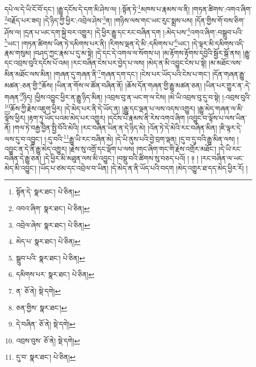 དཔེ་ལ་དེ་ཡི་ངོ་བོ་དང་། །རྒྱུ་དངོས་དེ་དག་མི་ཤེས་ལ། །:སྟོན་ཏེ་\footnote{སྟོན་དེ་  སྣར་ཐང་།  པེ་ཅིན། }མཁས་པ་རྣམས་ལ་ནི། །གཏན་ཚིགས་:འགའ་ཞིག་\footnote{འབའ་ཞིག་  སྣར་ཐང་།  པེ་ཅིན། }བརྗོད་པར་ཟད། །དེ་ཉིད་ཀྱི་ཕྱིར་:འབྲེལ་ཤེས་\footnote{འབྲེལ་ཞེས་  སྣར་ཐང་།  པེ་ཅིན། }ན། །གཉིས་ལས་གང་ཡང་རུང་སྨྲས་པས། །དོན་གྱིས་གོ་བས་ཅིག་ཤོས་ལ། །དྲན་པ་ཡང་དག་སྐྱེ་བར་འགྱུར། །དེ་ཕྱིར་རྒྱུ་དང་རང་བཞིན་དག །:མེད་པས་\footnote{མེད་པ་  སྣར་ཐང་།  པེ་ཅིན། }འགའ་ཞིག་:བསྒྲུབ་པའི་\footnote{སྒྲུབ་པའི་  སྣར་ཐང་།  པེ་ཅིན། }ཡང་། །གཏན་ཚིགས་ཡིན་ཏེ་དམིགས་པར་ནི། །རིགས་ལྡན་དེ་མི་:དམིགས་པ་\footnote{དམིགས་པར་  སྣར་ཐང་།  པེ་ཅིན། }ཡང་། །དེ་ལྟར་མི་དམིགས་འདི་རྣམ་གསུམ། །བཤད་ཀྱང་རྣམ་པ་དུ་མ་སྟེ། །དེ་དང་དེ་འགལ་ལ་སོགས་པ། །མ་རྟོགས་རྟོགས་དབྱེའི་སྦྱོར་སྒོ་ནས། །རྒྱུ་དང་འབྲས་བུའི་དངོས་པོ་འམ། །རང་བཞིན་ངེས་པར་བྱེད་པ་ལས། །མེད་ན་མི་འབྱུང་ངེས་པ་སྟེ། །མ་མཐོང་ལས་མིན་མཐོང་ལས་མིན། །གཞན་དུ་གཞན་ནི་\footnote{ན་  ཅོ་ནེ།  སྡེ་དགེ། }གཞན་དག་དང་། །ངེས་པར་ཡོད་པའི་ངེས་པ་གང་། །དོན་གཞན་རྒྱུ་མཚན་:ཅན་གྱི་\footnote{ཅན་གྱིས་  སྣར་ཐང་། }ཆོས། །ཡིན་ན་གོས་ལ་ཚོན་བཞིན་ནོ། །ཆོས་དོན་གཞན་གྱི་རྒྱུ་མཚན་ཅན། །ཡིན་པར་གྱུར་ན་:དེ་གཞན་\footnote{དེ་བཞིན་  ཅོ་ནེ།  སྡེ་དགེ། }ཉིད། །ཕྱིས་འབྱུང་ཕྱིར་ན་རྒྱུ་ཉིད་མིན། །འབྲས་བུ་ན་ཡང་ག་ལ་ངེས། །མེ་ཡི་འབྲས་བུ་དུ་བ་སྟེ། །:འབྲས་བུའི་\footnote{འབྲས་བུས་  ཅོ་ནེ།  སྡེ་དགེ། }ཆོས་ཀྱི་རྗེས་འཇུག་ཕྱིར། །དེ་མེད་པར་ནི་དེ་ཡོད་ན། །རྒྱུ་དང་ལྡན་པ་ལས་འདས་འགྱུར། །རྒྱུ་མེད་གཞན་ལ་མི་ལྟོས་ཕྱིར། །རྟག་ཏུ་ཡོད་པའམ་མེད་པར་འགྱུར། །དངོས་པོ་རྣམས་ནི་རེས་འགའ་ཞིག །འབྱུང་བ་ལྟོས་པ་ལས་ཡིན་ནོ། །གལ་ཏེ་བརྒྱ་བྱིན་སྤྱི་བོའི་མེའི། །རང་བཞིན་ཡིན་ན་དེ་ཉིད་མེ། །འོན་ཏེ་དེ་མེའི་རང་བཞིན་མིན། །ཇི་ལྟར་དེ་ལས་དུ་བ་འབྱུང་། །:དུ་བའི་\footnote{དུ་བ་  སྣར་ཐང་།  པེ་ཅིན། }རྒྱུ་ཡི་རང་བཞིན་མེ། །དེ་ཡི་ནུས་པའི་བྱེ་བྲག་ལྡན། །དུ་བ་དུ་བའི་རྒྱུ་མིན་ལས། །འབྱུང་ན་དེ་ནི་རྒྱུ་མེད་འགྱུར། །རྗེས་སུ་འགྲོ་དང་ལྡོག་པ་ལས། །གང་ཞིག་གང་གི་རྗེས་འགྲོར་མཐོང་། །དེ་ཡི་རང་བཞིན་དེ་རྒྱུ་ཅན། །དེ་ཕྱིར་མི་མཐུན་ལས་མི་འབྱུང་། །བསྡུ་བའི་ཚིགས་སུ་བཅད་པའོ། ། ༈ ། །རང་བཞིན་ལ་ཡང་མེད་མི་འབྱུང་། །ཡོད་པ་ཙམ་དང་འབྲེལ་བ་ཡིན། །དེ་མེད་ན་ནི་ཡོད་པའི་བདག །མེད་འགྱུར་ཐ་དད་མེད་ཕྱིར་རོ། །
